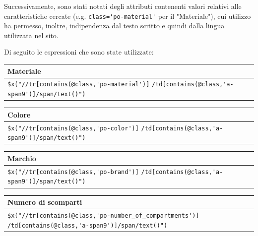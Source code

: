 \newpage
Successivamente, sono stati notati degli attributi contenenti valori relativi alle caratteristiche cercate (e.g. \verb|class='po-material'| per il "Materiale"), cui utilizzo ha permesso, inoltre, indipendenza dal testo scritto e quindi dalla lingua utilizzata nel sito.

Di seguito le espressioni che sono state utilizzate:
\begin{table}[h]
    \begin{tabularx}{\textwidth}{|X|}
        \hline
        \textbf{Materiale} \\
        \hline
        \verb|$x("//tr[contains(@class,'po-material')]|
        \newline
        \verb|/td[contains(@class,'a-span9')]/span/text()")|\\
        \hline
    \end{tabularx}
\label{tab:my_label}
\end{table}
\begin{table}[h]
    \begin{tabularx}{\textwidth}{|X|}
        \hline
        \textbf{Colore} \\
        \hline
        \verb|$x("//tr[contains(@class,'po-color')]|
        \newline
        \verb|/td[contains(@class,'a-span9')]/span/text()")|\\
        \hline
    \end{tabularx}
\label{tab:my_label}
\end{table}
\begin{table}[h]
    \begin{tabularx}{\textwidth}{|X|}
        \hline
        \textbf{Marchio} \\
        \hline
        \verb|$x("//tr[contains(@class,'po-brand')]|
        \newline
        \verb|/td[contains(@class,'a-span9')]/span/text()")|\\
        \hline
    \end{tabularx}
\label{tab:my_label}
\end{table}
\begin{table}[h]
    \begin{tabularx}{\textwidth}{|X|}
        \hline
        \textbf{Numero di scomparti} \\
        \hline
        \verb|$x("//tr[contains(@class,'po-number_of_compartments')]|
        \newline
        \verb|/td[contains(@class,'a-span9')]/span/text()")|\\
        \hline
    \end{tabularx}
\label{tab:my_label}
\end{table}

